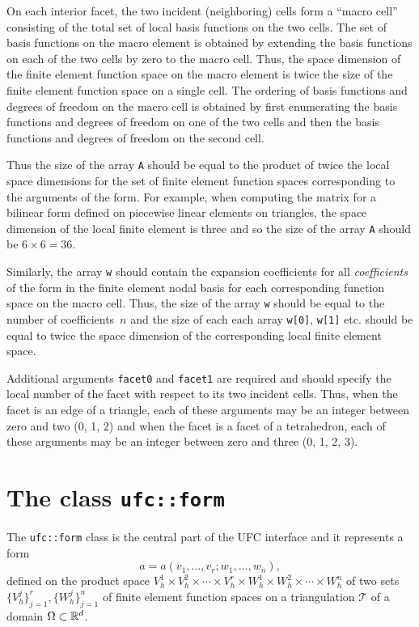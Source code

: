 On each interior facet, the two incident (neighboring) cells form a
``macro cell'' consisting of the total set of local basis functions on
the two cells. The set of basis functions on the macro element is
obtained by extending the basis functions on each of the two cells by
zero to the macro cell. Thus, the space dimension of the finite
element function space on the macro element is twice the size of the
finite element function space on a single cell. The ordering of basis
functions and degrees of freedom on the macro cell is obtained by
first enumerating the basis functions and degrees of freedom on one of
the two cells and then the basis functions and degrees of freedom on
the second cell.

Thus the size of the array \texttt{A} should be equal to the product
of twice the local space dimensions for the set of finite element
function spaces corresponding to the arguments of the form. For
example, when computing the matrix for a bilinear form defined on
piecewise linear elements on triangles, the space dimension of the
local finite element is three and so the size of the array \texttt{A}
should be $6 \times 6 = 36$.

Similarly, the array \texttt{w} should contain the expansion
coefficients for all \emph{coefficients} of the form in the finite
element nodal basis for each corresponding function space on the macro
cell. Thus, the size of the array \texttt{w} should be equal to the
number of coefficients~$n$ and the size of each each array
\texttt{w[0]}, \texttt{w[1]} etc. should be equal to twice the space
dimension of the corresponding local finite element space.

Additional arguments \texttt{facet0} and \texttt{facet1} are required
and should specify the local number of the facet with respect to its
two incident cells. Thus, when the facet is an edge of a triangle, each
of these arguments may be an integer between zero and two (0, 1, 2)
and when the facet is a facet of a tetrahedron, each of these
arguments may be an integer between zero and three (0, 1, 2, 3).

\section{The class \texttt{ufc::form}}

The \texttt{ufc::form} class is the central part of the UFC interface
and it represents a form
\begin{equation}
  a = a(v_1, \ldots, v_r; w_1, \ldots, w_n), 
\end{equation}
defined on the product space $V_h^1 \times V_h^2 \times \cdots \times
V_h^r \times W_h^1 \times W_h^2 \times \cdots \times W_h^n$ of two
sets $\{V_h^j\}_{j=1}^r, \{W_h^j\}_{j=1}^n$ of finite element function
spaces on a triangulation $\mathcal{T}$ of a domain $\Omega \subset
\mathbb{R}^d$.


